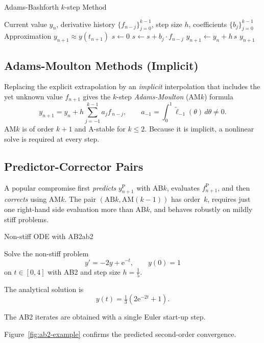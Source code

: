 \begin{algorithm}[htbp]
  \caption{Adams-Bashforth $k$-step Method}
  \label{alg:abk}
  \begin{algorithmic}[1]
    \Require Current value $y_n$, derivative history
    $\{f_{n-j}\}_{j=0}^{k-1}$, step size $h$,
    coefficients $\{b_j\}_{j=0}^{k-1}$
    \Ensure Approximation $y_{n+1}\approx y(t_{n+1})$
    \State $s\gets 0$
    \State $s\gets s + b_j\cdot f_{n-j}$
    \EndFor
    \State $y_{n+1}\gets y_n + h\,s$
    \State \Return $y_{n+1}$
    \EndFunction
  \end{algorithmic}
\end{algorithm}

\subsection{Adams-Moulton Methods (Implicit)}
\label{sec:am}
Replacing the explicit extrapolation by an \emph{implicit} interpolation that includes the yet unknown value $f_{n+1}$ gives the $k$-step \emph{Adams-Moulton} (AM$k$) formula
\[
  y_{n+1} = y_n + h\sum_{j=-1}^{k-1}a_jf_{\,n-j},
  \qquad
  a_{-1} = \!\int_{0}^{1}\tilde{\ell}_{-1}(\theta)\,d \theta \neq 0.
\]
AM$k$ is of order $k+1$ and A-stable for $k\le2$.
Because it is implicit, a nonlinear solve is required at every step.

\subsection{Predictor-Corrector Pairs}
\label{sec:pc}
A popular compromise first \emph{predicts} $y_{n+1}^{\mathrm{P}}$ with AB$k$, evaluates $f_{n+1}^{\mathrm{P}}$, and then \emph{corrects} using AM$k$.
The pair $(\text{AB}k,\text{AM}(k-1))$ has order~$k$, requires just one right-hand side evaluation more than AB$k$, and behaves robustly on mildly stiff problems.

\begin{example}{Non-stiff ODE with AB2}{ab2}

  Solve the non-stiff problem
  \[
    y'=-2y+\mathrm{e}^{-t}, \qquad y(0)=1
  \]
  on \(t\in[0,4]\) with AB2 and step size \(h=\frac{1}{5}\).

  The analytical solution is
  \[
    y(t)=\tfrac13\left(2\mathrm{e}^{-2t}+1\right).
  \]

  The AB2 iterates are obtained with a single Euler start-up step.

  Figure~\ref{fig:ab2-example} confirms the predicted second-order convergence.
\end{example}

